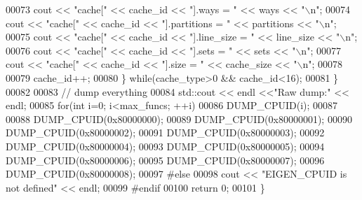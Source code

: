 \begin{DoxyCode}
00073       cout << \textcolor{stringliteral}{"cache["} << cache\_id << \textcolor{stringliteral}{"].ways       = "} << ways << \textcolor{stringliteral}{"\(\backslash\)n"};
00074       cout << \textcolor{stringliteral}{"cache["} << cache\_id << \textcolor{stringliteral}{"].partitions = "} << partitions << \textcolor{stringliteral}{"\(\backslash\)n"};
00075       cout << \textcolor{stringliteral}{"cache["} << cache\_id << \textcolor{stringliteral}{"].line\_size  = "} << line\_size << \textcolor{stringliteral}{"\(\backslash\)n"};
00076       cout << \textcolor{stringliteral}{"cache["} << cache\_id << \textcolor{stringliteral}{"].sets       = "} << sets << \textcolor{stringliteral}{"\(\backslash\)n"};
00077       cout << \textcolor{stringliteral}{"cache["} << cache\_id << \textcolor{stringliteral}{"].size       = "} << cache\_size << \textcolor{stringliteral}{"\(\backslash\)n"};
00078       
00079       cache\_id++;
00080     \} \textcolor{keywordflow}{while}(cache\_type>0 && cache\_id<16);
00081   \}
00082   
00083   \textcolor{comment}{// dump everything}
00084   std::cout << endl <<\textcolor{stringliteral}{"Raw dump:"} << endl;
00085   \textcolor{keywordflow}{for}(\textcolor{keywordtype}{int} i=0; i<max\_funcs; ++i)
00086     DUMP\_CPUID(i);
00087 
00088   DUMP\_CPUID(0x80000000);
00089   DUMP\_CPUID(0x80000001);
00090   DUMP\_CPUID(0x80000002);
00091   DUMP\_CPUID(0x80000003);
00092   DUMP\_CPUID(0x80000004);
00093   DUMP\_CPUID(0x80000005);
00094   DUMP\_CPUID(0x80000006);
00095   DUMP\_CPUID(0x80000007);
00096   DUMP\_CPUID(0x80000008);
00097 \textcolor{preprocessor}{  #else}
00098   cout << \textcolor{stringliteral}{"EIGEN\_CPUID is not defined"} << endl;
00099 \textcolor{preprocessor}{  #endif}
00100   \textcolor{keywordflow}{return} 0;
00101 \}
\end{DoxyCode}
